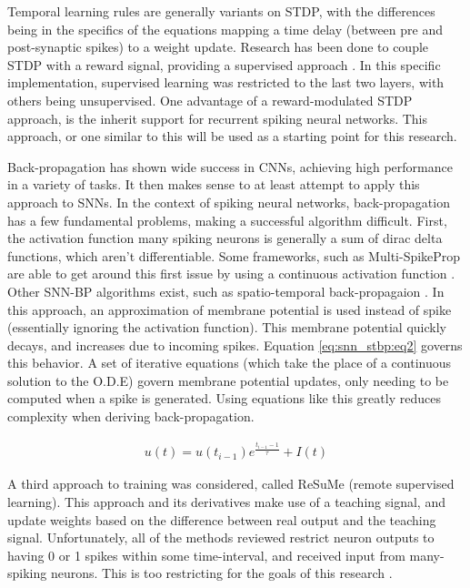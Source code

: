     Temporal learning rules are generally variants on STDP, with the differences
    being in the specifics of the equations mapping a time delay (between pre
    and post-synaptic spikes) to a weight update. Research has been done to
    couple STDP with a reward signal, providing a supervised approach
    \cite{rstdp_mnist}. In this specific implementation, supervised learning was
    restricted to the last two layers, with others being unsupervised. One
    advantage of a reward-modulated STDP approach, is the inherit support for
    recurrent spiking neural networks. This approach, or one similar to this
    will be used as a starting point for this research.
    
    Back-propagation has shown wide success in CNNs, achieving high performance
    in a variety of tasks. It then makes sense to at least attempt to apply this
    approach to SNNs. In the context of spiking neural networks,
    back-propagation has a few fundamental problems, making a successful
    algorithm difficult. First, the activation function many spiking neurons is
    generally a sum of dirac delta functions, which aren't differentiable. Some
    frameworks, such as Multi-SpikeProp are able to get around this first issue
    by using a continuous activation function \cite{deep_spike}. Other SNN-BP
    algorithms exist, such as spatio-temporal back-propagaion
    \cite{snn_stbp}. In this approach, an approximation of membrane potential is
    used instead of spike (essentially ignoring the activation function). This
    membrane potential quickly decays, and increases due to incoming
    spikes. Equation \ref{eq:snn_stbp:eq2} governs this behavior. A set of
    iterative equations (which take the place of a continuous solution to the
    O.D.E) govern membrane potential updates, only needing to be computed when a
    spike is generated. Using equations like this greatly reduces complexity
    when deriving back-propagation.
    
    \begin{align}
        u(t) = u(t_{i-1})e^{\frac{t_{i-1} - 1}{\tau}} +
        I(t) \label{eq:snn_stbp:eq2}
    \end{align}
    
    A third approach to training was considered, called ReSuMe (remote
    supervised learning). This approach and its derivatives make use of a
    teaching signal, and update weights based on the difference between real
    output and the teaching signal. Unfortunately, all of the methods reviewed
    restrict neuron outputs to having 0 or 1 spikes within some time-interval,
    and received input from many-spiking neurons. This is too restricting for
    the goals of this research \cite{deep_spike}.
    
